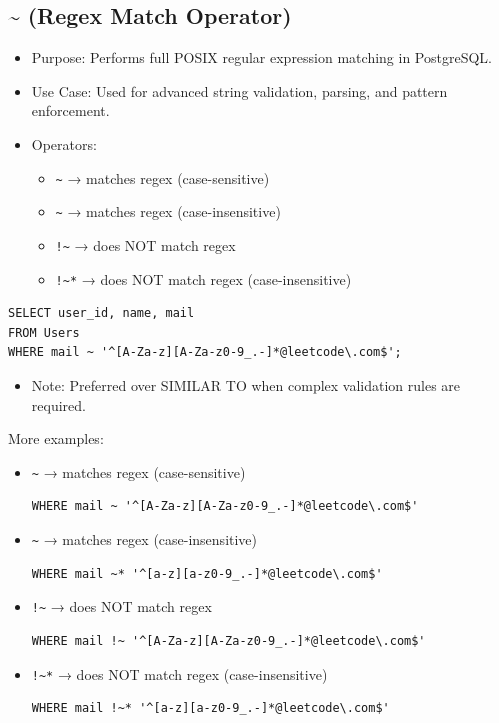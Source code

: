 \documentclass[10pt]{article}
\begin{document}
\subsection{\textasciitilde{} (Regex Match Operator)}
\begin{itemize}
    \item Purpose: Performs full POSIX regular expression matching in PostgreSQL.
    \item Use Case: Used for advanced string validation, parsing, and pattern enforcement.
    \item Operators:
    \begin{itemize}
        \item \texttt{\textasciitilde{}} → matches regex (case-sensitive)
        \item \texttt{\textasciitilde*} → matches regex (case-insensitive)
        \item \texttt{!\textasciitilde} → does NOT match regex
        \item \texttt{!\textasciitilde{}*} → does NOT match regex (case-insensitive)
    \end{itemize}
\end{itemize}

\begin{verbatim}
SELECT user_id, name, mail
FROM Users
WHERE mail ~ '^[A-Za-z][A-Za-z0-9_.-]*@leetcode\.com$';
\end{verbatim}

\begin{itemize}
    \item Note: Preferred over SIMILAR TO when complex validation rules are required.
\end{itemize}

More examples: 
\begin{itemize}
    \item \texttt{\textasciitilde{}} → matches regex (case-sensitive)

\begin{verbatim}
WHERE mail ~ '^[A-Za-z][A-Za-z0-9_.-]*@leetcode\.com$'
\end{verbatim}

    \item \texttt{\textasciitilde*} → matches regex (case-insensitive)

\begin{verbatim}
WHERE mail ~* '^[a-z][a-z0-9_.-]*@leetcode\.com$'
\end{verbatim}

    \item \texttt{!\textasciitilde} → does NOT match regex

\begin{verbatim}
WHERE mail !~ '^[A-Za-z][A-Za-z0-9_.-]*@leetcode\.com$'
\end{verbatim}

    \item \texttt{!\textasciitilde{}*} → does NOT match regex (case-insensitive)

\begin{verbatim}
WHERE mail !~* '^[a-z][a-z0-9_.-]*@leetcode\.com$'
\end{verbatim}
\end{itemize}
\end{document}
